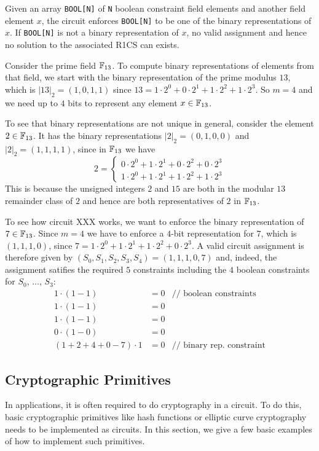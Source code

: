 Given an array \texttt{BOOL[N]} of \texttt{N} boolean constraint field elements and another field element $x$, the circuit enforces \texttt{BOOL[N]} to be one of the binary representations of $x$. If \texttt{BOOL[N]} is not a binary representation of $x$, no valid assignment and hence no solution to the associated R1CS can exists. 
\begin{example} Consider the prime field $\mathbb{F}_{13}$. To compute binary representations of elements from that field, we start with the binary representation of the prime modulus $13$, which is $|13|_2 = (1,0,1,1)$ since 
$13= 1\cdot 2^0 + 0\cdot 2^1 + 1\cdot 2^2 + 1\cdot 2^3$. So $m=4$ and we need up to $4$ bits to represent any element $x\in\mathbb{F}_{13}$.

To see that binary representations are not unique in general, consider the element $2\in \mathbb{F}_{13}$. It has the binary representations $|2|_{2}=(0,1,0,0)$ and $|2|_{2}=(1,1,1,1)$, since in $\mathbb{F}_{13}$ we have
$$
2 = \begin{cases}
0\cdot 2^0 + 1\cdot 2^1 + 0\cdot 2^2 + 0\cdot 2^3\\
1\cdot 2^0 + 1\cdot 2^1 + 1\cdot 2^2 + 1\cdot 2^3
\end{cases}
$$
This is because the unsigned integers $2$ and $15$ are both in the modular $13$ remainder class of $2$ and hence are both representatives of $2$ in $\mathbb{F}_{13}$.

To see how circuit XXX works, we want to enforce the binary representation of $7\in \mathbb{F}_{13}$. Since $m=4$ we have to enforce a $4$-bit representation for $7$, which is $(1,1,1,0)$, since $7= 1\cdot 2^0 + 1\cdot 2^1 + 1\cdot 2^2 + 0\cdot 2^3$. A valid circuit assignment is therefore given by $(S_0,S_1,S_2,S_3,S_4)=(1,1,1,0,7)$ and, indeed, the assignment satifies the required $5$ constraints including the $4$ boolean constraints for $S_0$, $\ldots$, $S_3$: 
\begin{align*}
1\cdot (1-1) &= 0 & \text{// boolean constraints}\\
1\cdot (1-1) &= 0 \\
1\cdot (1-1) &= 0 \\
0\cdot (1-0) &= 0  \\
(1 + 2 + 4 + 0 -7)\cdot 1 &= 0  & \text{// binary rep. constraint}
\end{align*}
\end{example}
\subsection{Cryptographic Primitives}
In applications, it is often required to do cryptography in a circuit. To do this, basic cryptographic primitives like hash functions or elliptic curve cryptography needs to be implemented as circuits. In this section, we give a few basic examples of how to implement such primitives. 
